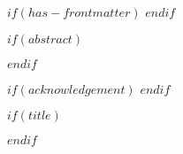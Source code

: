 $if(has-frontmatter)$
\frontmatter
$endif$

$if(abstract)$
\begin{abstract}
$abstract$
\end{abstract}
$endif$

          
$if(acknowledgement)$
$endif$

$if(title)$
\maketitle
$endif$